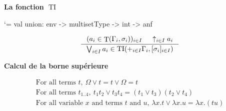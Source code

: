 \documentclass{beamer}
\newcommand\heading[1]{%
  \par\bigskip
  {\Large\bfseries#1}\par\smallskip}
\let\origlstlisting=\lstlisting
\let\endoriglstlisting=\endlstlisting
\renewenvironment{lstlisting}
{\mathcode`\-=\hyphenmathcode
    \everymath{}\mathsurround=0pt\origlstlisting}
{\endoriglstlisting}
\DeclareMathOperator{\iT}{T}
\DeclareMathOperator{\iTI}{TI}
\begin{document}
    \begin{frame}[containsverbatim]
    \heading{La fonction $\iTI$}
    \begin{lstlisting}
 val union: env -> multisetType -> int -> anf
    \end{lstlisting}
    
    \begin{displaymath}
        \inference[]{(a_i \in \iT(\Gamma_i, \sigma_i))_{i \in I} & \uparrow_{i \in I}a_i}{ \bigvee_{i \in I} a_i \in \iTI(+_{i \in I}\Gamma_i, [\sigma_i]_{i \in I}) }
    \end{displaymath}
    
    \heading{Calcul de la borne supérieure}
    \begin{gather*}
        \text{For all terms }t,\ \Omega \vee t = t \vee \Omega = t 
        \\
        \text{For all terms }t_{1..4},\ t_1t_2\vee t_3t_4 = (t_1\vee t_3)(t_2\vee t_4) \\
        \text{For all variable $x$ and terms $t$ and $u$, } \lambda x.t \vee \lambda x.u = \lambda x.(tu)
    \end{gather*}
    
    \end{frame}
    
\end{document}
